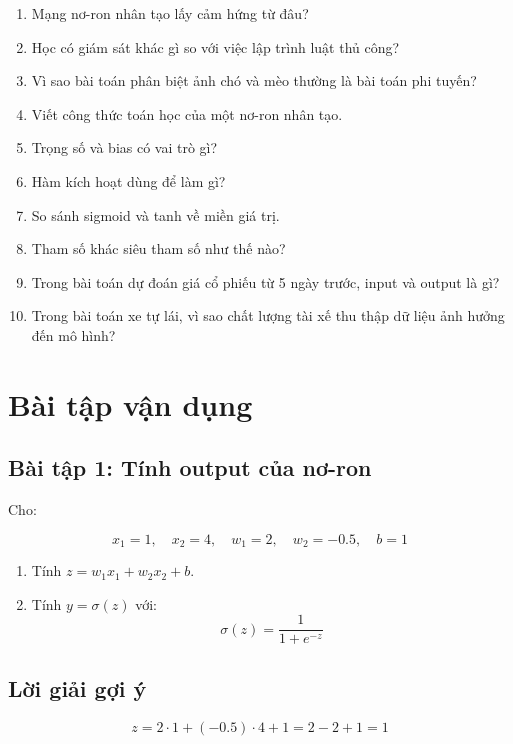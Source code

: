 \documentclass[12pt,a4paper]{report}
\begin{document}
\begin{enumerate}
    \item Mạng nơ-ron nhân tạo lấy cảm hứng từ đâu?
    \item Học có giám sát khác gì so với việc lập trình luật thủ công?
    \item Vì sao bài toán phân biệt ảnh chó và mèo thường là bài toán phi tuyến?
    \item Viết công thức toán học của một nơ-ron nhân tạo.
    \item Trọng số và bias có vai trò gì?
    \item Hàm kích hoạt dùng để làm gì?
    \item So sánh sigmoid và tanh về miền giá trị.
    \item Tham số khác siêu tham số như thế nào?
    \item Trong bài toán dự đoán giá cổ phiếu từ 5 ngày trước, input và output là gì?
    \item Trong bài toán xe tự lái, vì sao chất lượng tài xế thu thập dữ liệu ảnh hưởng đến mô hình?
\end{enumerate}

\chapter{Bài tập vận dụng}

\section*{Bài tập 1: Tính output của nơ-ron}

Cho:

\[
    x_1=1,\quad x_2=4,\quad w_1=2,\quad w_2=-0.5,\quad b=1
\]

\begin{enumerate}
    \item Tính $z=w_1x_1+w_2x_2+b$.
    \item Tính $y=\sigma(z)$ với:
    \[
        \sigma(z)=\frac{1}{1+e^{-z}}
    \]
\end{enumerate}

\section*{Lời giải gợi ý}

\[
    z = 2\cdot 1 + (-0.5)\cdot 4 + 1 = 2 - 2 + 1 = 1
\]
\end{document}
